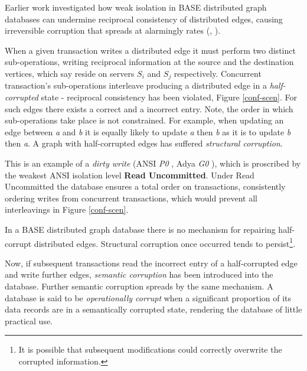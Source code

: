 \documentclass[sigplan,10pt]{acmart}
\begin{document}
Earlier work investigated how weak isolation in BASE distributed graph databases can undermine reciprocal consistency of distributed edges, causing irreversible corruption that spreads at alarmingly rates (\cite{Ezhilchelvan2018}, \cite{Webber2019}).

When a given transaction writes a distributed edge it must perform two distinct sub-operations, writing reciprocal information at the source and the destination vertices, which say reside on servers $S_i$ and $S_j$ respectively. Concurrent transaction's sub-operations interleave producing a distributed edge in a \emph{half-corrupted} state - reciprocal consistency has been violated, Figure \ref{conf-scen}. For such edges there exists a correct and a incorrect entry. Note, the order in which sub-operations take place is not constrained. For example, when updating an edge between \emph{a} and \emph{b} it is equally likely to update \emph{a} then \emph{b} as it is to update \emph{b} then \emph{a}. A graph with half-corrupted edges has suffered \emph{structural corruption}.

This is an example of a \emph{dirty write} (ANSI \emph{P0} \cite{Berenson1995}, Adya \emph{G0} \cite{Adya2000}), which is proscribed by the weakest ANSI isolation level \textbf{Read Uncommitted}. Under Read Uncommitted the database ensures a total order on transactions, consistently ordering writes from concurrent transactions, which would prevent all interleavings in Figure \ref{conf-scen}.

In a BASE distributed graph database there is no mechanism for repairing half-corrupt distributed edges. Structural corruption once occurred tends to persist\footnote{It is possible that subsequent modifications could correctly overwrite the corrupted information.}.

Now, if subsequent transactions read the incorrect entry of a half-corrupted edge and write further edges, \emph{semantic corruption} has been introduced into the database. Further semantic corruption spreads by the same mechanism. A database is said to be \emph{operationally corrupt} when a significant proportion of its data records are in a semantically corrupted state, rendering the database of little practical use.
\end{document}

